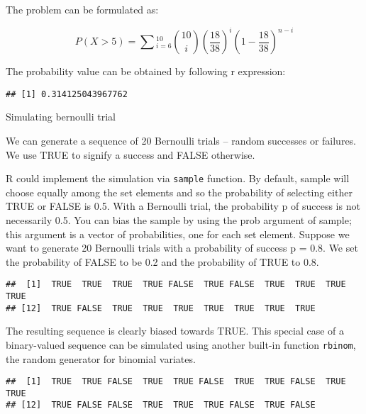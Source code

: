 \documentclass[ignorenonframetext,aspectratio=169]{beamer}
\begin{document}
\begin{frame}{}
\protect\hypertarget{section-11}{}

The problem can be formulated as:

\[
P(X > 5) = \sum{}^{10}_{i = 6}\binom{10}{i}\left( \frac{18}{38} \right)^i\left(1- \frac{18}{38} \right)^{n-i}
\]

\end{frame}

\begin{frame}[fragile]{}
\protect\hypertarget{section-12}{}

The probability value can be obtained by following r expression:

\begin{verbatim}
## [1] 0.314125043967762
\end{verbatim}

\end{frame}

\begin{frame}[fragile]{Simulating bernoulli trial}
\protect\hypertarget{simulating-bernoulli-trial}{}

We can generate a sequence of 20 Bernoulli trials -- random successes or
failures. We use TRUE to signify a success and FALSE otherwise.

R could implement the simulation via \texttt{sample} function. By
default, sample will choose equally among the set elements and so the
probability of selecting either TRUE or FALSE is 0.5. With a Bernoulli
trial, the probability p of success is not necessarily 0.5. You can bias
the sample by using the prob argument of sample; this argument is a
vector of probabilities, one for each set element. Suppose we want to
generate 20 Bernoulli trials with a probability of success p = 0.8. We
set the probability of FALSE to be 0.2 and the probability of TRUE to
0.8.

\begin{verbatim}
##  [1]  TRUE  TRUE  TRUE  TRUE FALSE  TRUE FALSE  TRUE  TRUE  TRUE  TRUE
## [12]  TRUE FALSE  TRUE  TRUE  TRUE  TRUE  TRUE  TRUE  TRUE
\end{verbatim}

\end{frame}

\begin{frame}[fragile]{}
\protect\hypertarget{section-13}{}

The resulting sequence is clearly biased towards TRUE. This special case
of a binary-valued sequence can be simulated using another built-in
function \texttt{rbinom}, the random generator for binomial variates.

\begin{verbatim}
##  [1]  TRUE  TRUE FALSE  TRUE  TRUE FALSE  TRUE  TRUE FALSE  TRUE  TRUE
## [12]  TRUE FALSE FALSE  TRUE  TRUE  TRUE FALSE  TRUE FALSE
\end{verbatim}

\end{frame}
\end{document}
